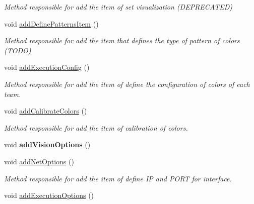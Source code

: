 \begin{DoxyCompactItemize}
\begin{DoxyCompactList}\small\item\em Method responsible for add the item of set visualization (D\+E\+P\+R\+E\+C\+A\+T\+ED) \end{DoxyCompactList}\item 
void \hyperlink{classMainWindow_a9f08218f96f231b1615ce24d933b15ce}{add\+Define\+Patterns\+Item} ()\hypertarget{classMainWindow_a9f08218f96f231b1615ce24d933b15ce}{}\label{classMainWindow_a9f08218f96f231b1615ce24d933b15ce}

\begin{DoxyCompactList}\small\item\em Method responsible for add the item that defines the type of pattern of colors (T\+O\+DO) \end{DoxyCompactList}\item 
void \hyperlink{classMainWindow_a4d645b048c765c34481cb4e7749af6cf}{add\+Execution\+Config} ()\hypertarget{classMainWindow_a4d645b048c765c34481cb4e7749af6cf}{}\label{classMainWindow_a4d645b048c765c34481cb4e7749af6cf}

\begin{DoxyCompactList}\small\item\em Method responsible for add the item of define the configuration of colors of each team. \end{DoxyCompactList}\item 
void \hyperlink{classMainWindow_a5fa2d31a87dcc532276b17ab49712add}{add\+Calibrate\+Colors} ()\hypertarget{classMainWindow_a5fa2d31a87dcc532276b17ab49712add}{}\label{classMainWindow_a5fa2d31a87dcc532276b17ab49712add}

\begin{DoxyCompactList}\small\item\em Method responsible for add the item of calibration of colors. \end{DoxyCompactList}\item 
void {\bfseries add\+Vision\+Options} ()\hypertarget{classMainWindow_a84f4504e9262385ede0b0e89832181f9}{}\label{classMainWindow_a84f4504e9262385ede0b0e89832181f9}

\item 
void \hyperlink{classMainWindow_ad4406d1714477f132de211c3351365cb}{add\+Net\+Options} ()\hypertarget{classMainWindow_ad4406d1714477f132de211c3351365cb}{}\label{classMainWindow_ad4406d1714477f132de211c3351365cb}

\begin{DoxyCompactList}\small\item\em Method responsible for add the item of define IP and P\+O\+RT for interface. \end{DoxyCompactList}\item 
void \hyperlink{classMainWindow_adb0b4159e334fb5b388a9eb1c4b8f5ca}{add\+Execution\+Options} ()\hypertarget{classMainWindow_adb0b4159e334fb5b388a9eb1c4b8f5ca}{}\label{classMainWindow_adb0b4159e334fb5b388a9eb1c4b8f5ca}


\end{DoxyCompactItemize}
